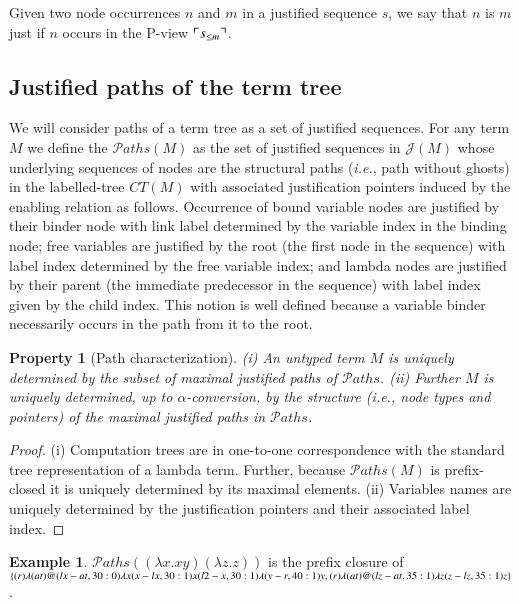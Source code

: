 \documentclass{elsarticle}
\makeatletter
\theoremstyle{plain}
\newtheorem{property}[theorem]{Property}
\theoremstyle{definition}
\newtheorem{example}{Example}[section]
\theoremstyle{remark}
\newcommand{\ctree}{CT} %
\newcommand\pathset{{\mathcal{P}aths}} %
\renewcommand\ie{{\it i.e.\@\xspace}}
\def\justseqset{\mathcal{J}}
\makeatother
\begin{document}
Given two node occurrences $n$ and $m$ in a justified sequence $s$, we say that $n$ is  $m$ just if $n$ occurs in the P-view $\ulcorner s_{\leq m} \urcorner$.

\subsection{Justified paths of the term tree}

We will consider paths of a term tree as a set of justified sequences. For any term $M$ we define the  $\pathset(M)$ as the set of justified sequences in $\justseqset(M)$ whose underlying sequences of nodes are the structural paths (\ie, path without ghosts) in the labelled-tree $\ctree(M)$ with associated justification pointers induced by the enabling relation as follows. Occurrence of bound variable nodes are justified by their binder node with link label determined by the variable index in the binding node; free variables are justified by the root (the first node in the sequence) with label index determined by the free variable index; and lambda nodes are justified by their parent (the immediate predecessor in the sequence) with label index given by the child index. This notion is well defined because a variable binder necessarily occurs in the path from it to the root.
\begin{property}[Path characterization]
\label{prop:tree_path_charact}
(i) An untyped term $M$ is uniquely determined by the subset of maximal justified paths of $\pathset$.
(ii) Further $M$ is uniquely determined, up to $\alpha$-conversion, by the \emph{structure} (\ie, node types and pointers) of the maximal justified paths in $\pathset$.
\end{property}
\begin{proof}
(i) Computation trees are in one-to-one correspondence with the standard tree representation of a lambda term. Further, because $\pathset(M)$ is prefix-closed it is uniquely determined by its maximal elements. (ii) Variables names are uniquely determined by the justification pointers and their associated label index.
\end{proof}

\begin{example}
  $\pathset((\lambda x.x y) (\lambda z.z))$ is the prefix closure of
  $\{
  \Pstr{ (r){\lambda} (at){@} (lx-at,30:0){\lambda x} (x-lx,30:1){x} (l2-x,30:1){\lambda} (y-r,40:1){y} },
  \Pstr{ (r){\lambda} (at){@} (lz-at,35:1){\lambda z} (z-lz,35:1){z}}
  \}$.
\end{example}
\end{document}
